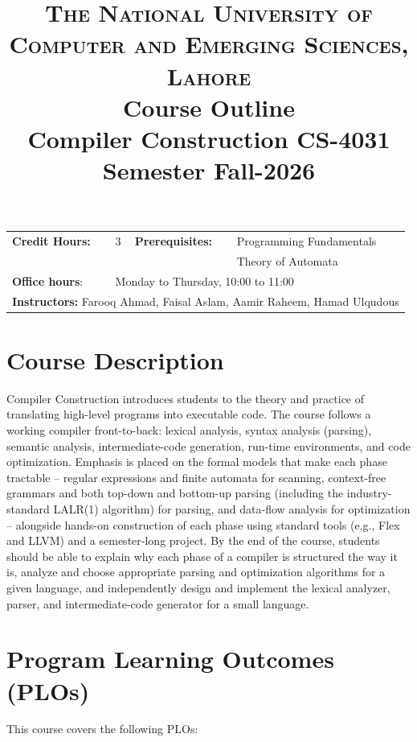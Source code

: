 \documentclass{article}
\title{
{\Large\scshape The National University of Computer and Emerging Sciences, Lahore}\\[10pt]
{\large Course Outline}\\[4pt]
{\Huge\textbf{Compiler Construction CS-4031}}\\[8pt]
{\normalsize Semester Fall-2026}
}
\author{ }
\date{}
\begin{document}
\maketitle
\vspace{-0.5cm}

\begin{table}[H]
    \centering
    \def\arraystretch{1.5}
    \begin{tabularx}{\textwidth}{ l X l X }
        \textbf{Credit Hours:} & 3 & \textbf{Prerequisites:} & Programming Fundamentals\\
        & & & Theory of Automata \\
        \textbf{Office hours}: & \multicolumn{3}{l}{Monday to Thursday, 10:00 to 11:00} \\
        \multicolumn{4}{l}{\textbf{Instructors:} Farooq Ahmad, Faisal Aslam, Aamir Raheem, Hamad Ulqudous} \\
    \end{tabularx}
    \label{tab:Intro}
\end{table}
\vspace{-1cm}

\section*{Course Description}
Compiler Construction introduces students to the theory and practice of translating high-level programs into executable code. The course follows a working compiler front-to-back: lexical analysis, syntax analysis (parsing), semantic analysis, intermediate-code generation, run-time environments, and code optimization. Emphasis is placed on the formal models that make each phase tractable -- regular expressions and finite automata for scanning, context-free grammars and both top-down and bottom-up parsing (including the industry-standard LALR(1) algorithm) for parsing, and data-flow analysis for optimization -- alongside hands-on construction of each phase using standard tools (e.g., Flex and LLVM) and a semester-long project. By the end of the course, students should be able to explain why each phase of a compiler is structured the way it is, analyze and choose appropriate parsing and optimization algorithms for a given language, and independently design and implement the lexical analyzer, parser, and intermediate-code generator for a small language.

\section*{Program Learning Outcomes (PLOs)}
This course covers the following PLOs:
\end{document}
